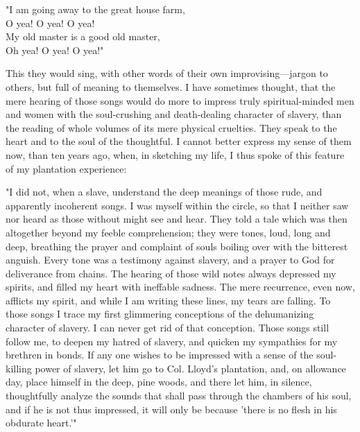 "I am going away to the great house farm,\\
{﻿}O yea! O yea! O yea!\\
My old master is a good old master,\\
{﻿}Oh yea! O yea! O yea!"

This they would sing, with other words of their own improvising---jargon
to others, but full of meaning to themselves. I have sometimes thought,
that the mere hearing of those songs would do more to impress truly
spiritual-minded men and women with the soul-crushing and death-dealing
character of slavery, than the reading of whole volumes of its mere
physical cruelties. They speak to the heart and to the soul of the
thoughtful. I cannot better express my sense of them now, than ten years
ago, when, in sketching my life, I thus spoke of this feature of my
plantation experience:

{\protect\hypertarget{99}{}{}}

"I did not, when a slave, understand the deep meanings of those rude,
and apparently incoherent songs. I was myself within the circle, so that
I neither saw nor heard as those without might see and hear. They told a
tale which was then altogether beyond my feeble comprehension; they were
tones, loud, long and deep, breathing the prayer and complaint of souls
boiling over with the bitterest anguish. Every tone was a testimony
against slavery, and a prayer to God for deliverance from chains. The
hearing of those wild notes always depressed my spirits, and filled my
heart with ineffable sadness. The mere recurrence, even now, afflicts my
spirit, and while I am writing these lines, my tears are falling. To
those songs I trace my first glimmering conceptions of the dehumanizing
character of slavery. I can never get rid of that conception. Those
songs still follow me, to deepen my hatred of slavery, and quicken my
sympathies for my brethren in bonds. If any one wishes to be impressed
with a sense of the soul-killing power of slavery, let him go to Col.
Lloyd's plantation, and, on allowance day, place himself in the deep,
pine woods, and there let him, in silence, thoughtfully analyze the
sounds that shall pass through the chambers of his soul, and if he is
not thus impressed, it will only be because 'there is no flesh in his
obdurate heart.{'}"

~

